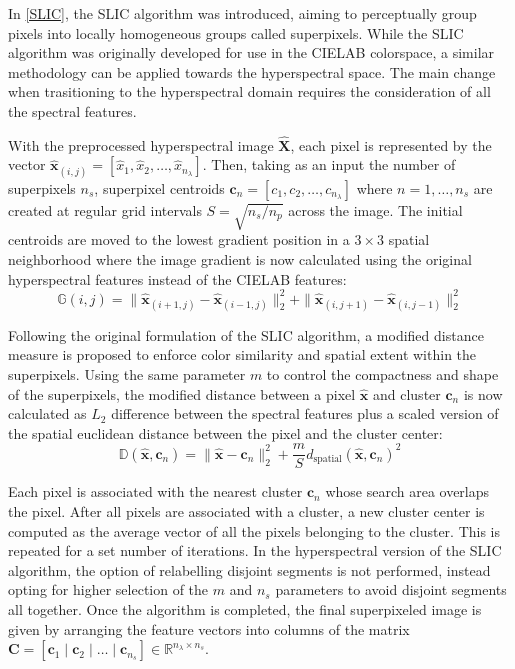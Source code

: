 In \ref{SLIC}, the SLIC algorithm was introduced, aiming to perceptually group pixels into locally homogeneous groups called superpixels. While the SLIC algorithm was originally developed for use in the CIELAB colorspace, a similar methodology can be applied towards the hyperspectral space. The main change when trasitioning to the hyperspectral domain requires the consideration of all the spectral features.

With the preprocessed hyperspectral image $\hat{\mathbf{X}}$, each pixel is represented by the vector $\hat{\mathbf{x}}_{(i,j)} = [\hat{x}_1, \hat{x}_2, \dots, \hat{x}_{n_\lambda}]$. Then, taking as an input the number of superpixels $n_s$, superpixel centroids $\mathbf{c}_n = [c_1, c_2, \dots, c_{n_\lambda}]$ where $n = 1,\dots, n_s$ are created at regular grid intervals $S = \sqrt{n_s/n_p}$ across the image. The initial centroids are moved to the lowest gradient position in a $3 \times 3$ spatial neighborhood where the image gradient is now calculated using the original hyperspectral features instead of the CIELAB features: 
\begin{equation}
    \label{eq:slic-gradient-2}
    \mathbb{G}(i,j) = \|\hat{\mathbf{x}}_{(i+1,j)} - \hat{\mathbf{x}}_{(i-1,j)} \|_2^2 + \|\hat{\mathbf{x}}_{(i,j+1)} - \hat{\mathbf{x}}_{(i,j-1)} \|_2^2
\end{equation}

Following the original formulation of the SLIC algorithm, a modified distance measure is proposed to enforce color similarity and spatial extent within the superpixels. Using the same parameter $m$ to control the compactness and shape of the superpixels, the modified distance between a pixel $\hat{\mathbf{x}}$ and cluster $\mathbf{c}_n$ is now calculated as $L_2$ difference between the spectral features plus a scaled version of the spatial euclidean distance between the pixel and the cluster center:
\begin{equation}
    \label{eq:slic-cielab-distance-hsi}
    \mathbb{D}(\hat{\mathbf{x}}, \mathbf{c}_n) = \|\hat{\mathbf{x}} - \mathbf{c}_n\|_2^2 + \frac{m}{S}d_{\text{spatial}}(\hat{\mathbf{x}}, \mathbf{c}_n)^2
\end{equation}

Each pixel is associated with the nearest cluster $\mathbf{c}_n$ whose search area overlaps the pixel. After all pixels are associated with a cluster, a new cluster center is computed as the average vector of all the pixels belonging to the cluster. This is repeated for a set number of iterations. In the hyperspectral version of the SLIC algorithm, the option of relabelling disjoint segments is not performed, instead opting for higher selection of the $m$ and $n_s$ parameters to avoid disjoint segments all together. Once the algorithm is completed, the final superpixeled image is given by arranging the feature vectors into columns of the matrix $\mathbf{C} = [\mathbf{c}_1 \; | \;\mathbf{c}_2 \;| \;\dots \;|\; \mathbf{c}_{n_s}] \in \mathbb{R}^{n_\lambda \times n_s}$. 

